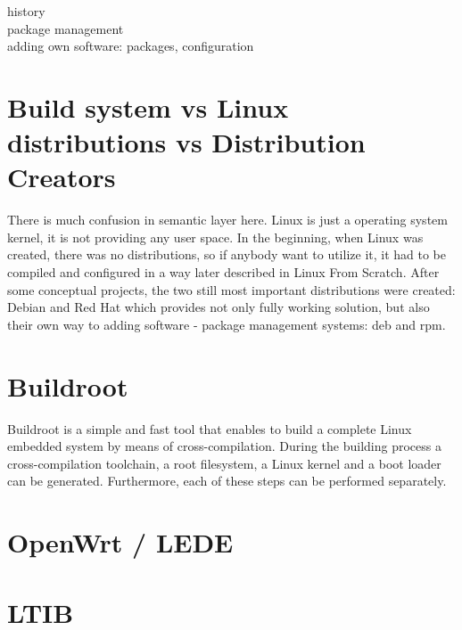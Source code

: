\documentclass[printmode]{mgr}
\begin{document}



history\\
package management\\
adding own software: packages, configuration\\

\section{Build system vs Linux distributions vs Distribution Creators}
There is much confusion in semantic layer here. Linux is just a operating system kernel, it is not providing any user space.
In the beginning, when Linux was created, there was no distributions, so if anybody want to utilize it, it had to be compiled and configured in a way later described in Linux From Scratch.
After some conceptual projects, the two still most important distributions were created: Debian and Red Hat which provides not only fully working solution, but also their own way to adding software - package management systems: deb and rpm. 

\section{Buildroot}

Buildroot is a simple and fast tool that enables to build a complete Linux embedded system by means of cross-compilation. During the building process a cross-compilation toolchain, a root filesystem, a Linux kernel and a boot loader can be generated.  Furthermore, each of these steps can be performed separately.

\section{OpenWrt / LEDE}



\section{LTIB}

\end{document}
